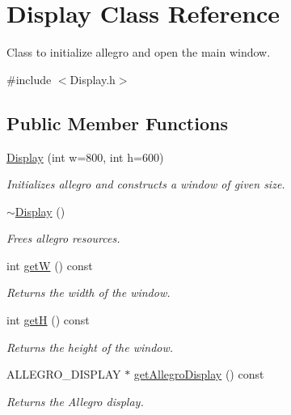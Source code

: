 \hypertarget{class_display}{}\section{Display Class Reference}
\label{class_display}


Class to initialize allegro and open the main window.  




{\ttfamily \#include $<$Display.\+h$>$}

\subsection*{Public Member Functions}
\begin{DoxyCompactItemize}
\item 
\mbox{\hyperlink{class_display_a0b933deaf4610198cbc5f89097cb077b}{Display}} (int w=800, int h=600)
\begin{DoxyCompactList}\small\item\em Initializes allegro and constructs a window of given size. \end{DoxyCompactList}\item 
\mbox{\hyperlink{class_display_ac2607a6bb236c55547a4223d40d85d1f}{$\sim$\+Display}} ()
\begin{DoxyCompactList}\small\item\em Frees allegro resources. \end{DoxyCompactList}\item 
int \mbox{\hyperlink{class_display_a246593e6e7d4e634e9c638525e103b6e}{getW}} () const
\begin{DoxyCompactList}\small\item\em Returns the width of the window. \end{DoxyCompactList}\item 
int \mbox{\hyperlink{class_display_a5faae23c211bed34aca048b98e2b9e81}{getH}} () const
\begin{DoxyCompactList}\small\item\em Returns the height of the window. \end{DoxyCompactList}\item 
A\+L\+L\+E\+G\+R\+O\+\_\+\+D\+I\+S\+P\+L\+AY $\ast$ \mbox{\hyperlink{class_display_a800ce141e803ab23b029a6638860ab51}{get\+Allegro\+Display}} () const
\begin{DoxyCompactList}\small\item\em Returns the Allegro display. \end{DoxyCompactList}\end{DoxyCompactItemize}


